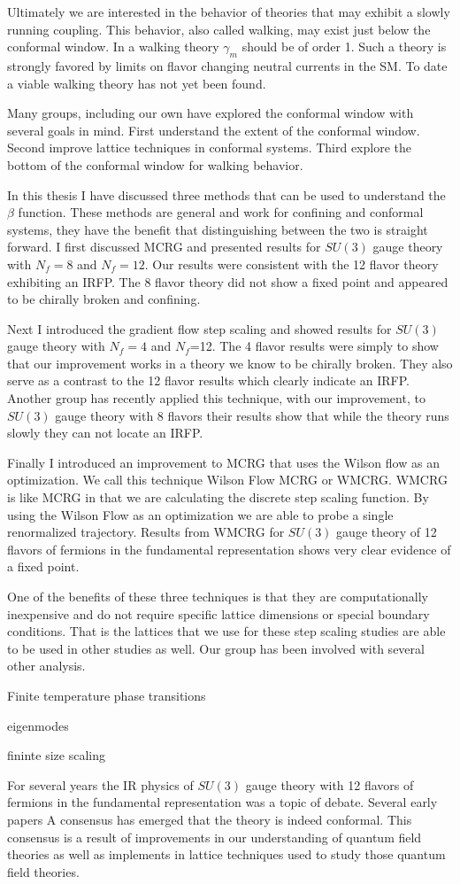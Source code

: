 Ultimately we are interested in the behavior of theories that may exhibit a slowly running coupling.
This behavior, also called walking, may exist just below the conformal window.
In a walking theory $\gamma_m$ should be of order 1.
Such a theory is strongly favored by limits on flavor changing neutral currents in the SM.
To date a viable walking theory has not yet been found.

Many groups, including our own have explored the conformal window with several goals in mind.
First understand the extent of the conformal window.
Second improve lattice techniques in conformal systems.
Third explore the bottom of the conformal window for walking behavior.

In this thesis I have discussed three methods that can be used to understand the $\beta$ function.
These methods are general and work for confining and conformal systems, they have the benefit that distinguishing between the two is straight forward.
I first discussed MCRG and presented results for $SU(3)$ gauge theory with $N_f=8$ and $N_f=12$.
Our results were consistent with the 12 flavor theory exhibiting an IRFP.
The 8 flavor theory did not show a fixed point and appeared to be chirally broken and confining.

Next I introduced the gradient flow step scaling and showed results for $SU(3)$ gauge theory with $N_f=4$ and $N_f$=12.
The 4 flavor results were simply to show that our improvement works in a theory we know to be chirally broken.
They also serve as a contrast to the 12 flavor results which clearly indicate an IRFP.
Another group has recently applied this technique, with our improvement, to $SU(3)$ gauge theory with 8 flavors \cite{} their results show that while the theory runs slowly they can not locate an IRFP.

Finally I introduced an improvement to MCRG that uses the Wilson flow as an optimization.
We call this technique Wilson Flow MCRG or WMCRG.
WMCRG is like MCRG in that we are calculating the discrete step scaling function.
By using the Wilson Flow as an optimization we are able to probe a single renormalized trajectory.
Results from WMCRG for $SU(3)$ gauge theory of 12 flavors of fermions in the fundamental representation shows very clear evidence of a fixed point.

One of the benefits of these three techniques is that they are computationally inexpensive and do not require specific lattice dimensions or special boundary conditions.
That is the lattices that we use for these step scaling studies are able to be used in other studies as well.
Our group has been involved with several other analysis.

Finite temperature phase transitions

eigenmodes

fininte size scaling

For several years the IR physics of $SU(3)$ gauge theory with 12 flavors of fermions in the fundamental representation was a topic of debate.
Several early papers \cite{} 
A consensus has emerged that the theory is indeed conformal.
This consensus is a result of improvements in our understanding of quantum field theories as well as implements in lattice techniques used to study those quantum field theories.
